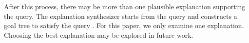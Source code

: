 \documentclass[letterpaper]{article} %
\begin{document}
After this process, there may be more than one plausible explanation
supporting the query.  The explanation synthesizer starts from the
query and constructs a goal tree to satisfy the query
\cite{leilanithesis}.  For this paper, we only examine one
explanation.  Choosing the best explanation may be explored in future
work.








\end{document}
